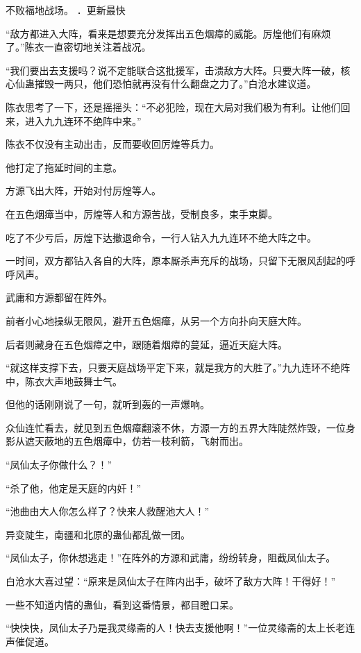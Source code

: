 
\begin{this_body}

不败福地战场。 ．更新最快

“敌方都进入大阵，看来是想要充分发挥出五色烟瘴的威能。厉煌他们有麻烦了。”陈衣一直密切地关注着战况。

“我们要出去支援吗？说不定能联合这批援军，击溃敌方大阵。只要大阵一破，核心仙蛊摧毁一两只，他们恐怕就再没有什么翻盘之力了。”白沧水建议道。

陈衣思考了一下，还是摇摇头：“不必犯险，现在大局对我们极为有利。让他们回来，进入九九连环不绝阵中来。”

陈衣不仅没有主动出击，反而要收回厉煌等兵力。

他打定了拖延时间的主意。

方源飞出大阵，开始对付厉煌等人。

在五色烟瘴当中，厉煌等人和方源苦战，受制良多，束手束脚。

吃了不少亏后，厉煌下达撤退命令，一行人钻入九九连环不绝大阵之中。

一时间，双方都钻入各自的大阵，原本厮杀声充斥的战场，只留下无限风刮起的呼呼风声。

武庸和方源都留在阵外。

前者小心地操纵无限风，避开五色烟瘴，从另一个方向扑向天庭大阵。

后者则藏身在五色烟瘴之中，跟随着烟瘴的蔓延，逼近天庭大阵。

“就这样支撑下去，只要天庭战场平定下来，就是我方的大胜了。”九九连环不绝阵中，陈衣大声地鼓舞士气。

但他的话刚刚说了一句，就听到轰的一声爆响。

众仙连忙看去，就见到五色烟瘴翻滚不休，方源一方的五界大阵陡然炸毁，一位身影从遮天蔽地的五色烟瘴中，仿若一枝利箭，飞射而出。

“凤仙太子你做什么？！”

“杀了他，他定是天庭的内奸！”

“池曲由大人你怎么样了？快来人救醒池大人！”

异变陡生，南疆和北原的蛊仙都乱做一团。

“凤仙太子，你休想逃走！”在阵外的方源和武庸，纷纷转身，阻截凤仙太子。

白沧水大喜过望：“原来是凤仙太子在阵内出手，破坏了敌方大阵！干得好！”

一些不知道内情的蛊仙，看到这番情景，都目瞪口呆。

“快快快，凤仙太子乃是我灵缘斋的人！快去支援他啊！”一位灵缘斋的太上长老连声催促道。


\end{this_body}
